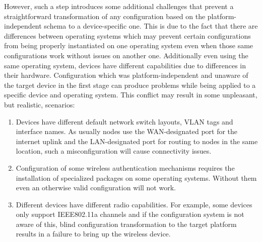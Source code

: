 \documentclass[5p,sort&compress]{elsarticle}
\begin{document}
However, such a step introduces some additional challenges that prevent a straightforward transformation of any configuration based on the platform-independent schema to a device-specific one.
This is due to the fact that there are differences between operating systems which may prevent certain configurations from being properly instantiated on one operating system even when those same configurations work without issues on another one.
Additionally even using the same operating system, devices have different capabilities due to differences in their hardware.
Configuration which was platform-independent and unaware of the target device in the first stage can produce problems while being applied to a specific device and operating system.
This conflict may result in some unpleasant, but realistic, scenarios:
\begin{enumerate}[label=\roman*)]
\item Devices have different default network switch layouts, VLAN tags and interface names.
As usually nodes use the WAN-designated port for the internet uplink and the LAN-designated port for routing to nodes in the same location, such a misconfiguration will cause connectivity issues.

\item Configuration of some wireless authentication mechanisms requires the installation of specialized packages on some operating systems.
Without them even an otherwise valid configuration will not work.

\item Different devices have different radio capabilities.
For example, some devices only support IEEE802.11a channels and if the configuration system is not aware of this, blind configuration transformation to the target platform results in a failure to bring up the wireless device.
\end{enumerate}
\end{document}
